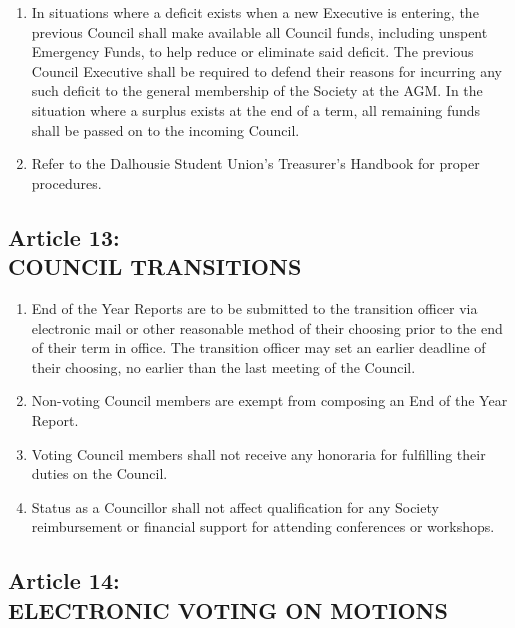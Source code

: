 \documentclass[]{report}
\begin{document}
\begin{enumerate}
		\item In situations where a deficit exists when a new Executive is entering, the previous Council shall make available all Council funds, including unspent Emergency Funds, to help reduce or eliminate said deficit. The previous Council Executive shall be required to defend their reasons for incurring any such deficit to the general membership of the Society at the AGM. In the situation where a surplus exists at the end of a term, all remaining funds shall be passed on to the incoming Council.
		
		\item Refer to the Dalhousie Student Union's Treasurer's Handbook for proper procedures.
	
	\end{enumerate}


\clearpage
\begin{center}
	\section*{Article 13:\\COUNCIL TRANSITIONS}
	\vspace{12px}
\end{center}
\label{}

	\renewcommand{\theenumi}{\Alph{enumi}}
	\begin{enumerate}
	
		\item End of the Year Reports are to be submitted to the transition officer via electronic mail or other reasonable method of their choosing prior to the end of their term in office. The transition officer may set an earlier deadline of their choosing, no earlier than the last meeting of the Council.
		
		\item Non-voting Council members are exempt from composing an End of the Year Report.
		
		\item Voting Council members shall not receive any honoraria for fulfilling their duties on the Council.
		
		\item Status as a Councillor shall not affect qualification for any Society reimbursement or financial support for attending conferences or workshops.
		
	\end{enumerate}


\clearpage
\begin{center}
	\section*{Article 14:\\ELECTRONIC VOTING ON MOTIONS}
	\vspace{12px}
\end{center}
\label{}
\end{document}
